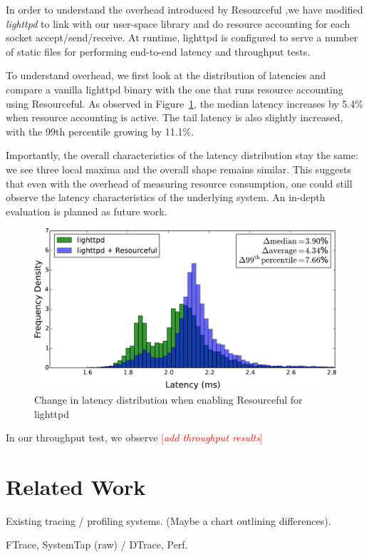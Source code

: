\documentclass[letterpaper,twocolumn,10pt]{article}
\newcommand{\pname}{Resourceful}
\newcommand{\lnote}[1]{\textcolor{red}{[\textit{#1}]}} %
\begin{document}
In order to understand the overhead introduced by \pname{ },we have modified
\textit{lighttpd} to link with our user-space library and do resource accounting
for each socket accept/send/receive. At runtime, lighttpd is configured to serve
a number of static files for performing end-to-end latency and throughput tests.

To understand overhead, we first look at the distribution of latencies and
compare a vanilla lighttpd binary with the one that runs resource accounting
using \pname. As observed in Figure~\ref{fig:experiment1}, the median latency increases by 5.4\%
when resource accounting is active. The tail latency is also slightly increased, with the 99th percentile
growing by 11.1\%. 

Importantly, the overall characteristics of the latency distribution stay the same:
we see three local maxima and the overall shape remains similar. This suggests that even with the overhead
of measuring resource consumption, one could still observe the latency characteristics of the underlying system.
An in-depth evaluation is planned as future work.
\begin{figure}[ht!] 
	\centering 
	\includegraphics[width=\columnwidth]{dist_and_fit2}
	\caption{Change in latency distribution when enabling \pname{ }for lighttpd} 
	\label{fig:experiment1}
\end{figure}

In our throughput test, we observe \lnote{add throughput results}



\section{Related Work} Existing tracing / profiling systems. (Maybe a chart
outlining differences).

FTrace, SystemTap (raw) / DTrace, Perf.
\end{document}
